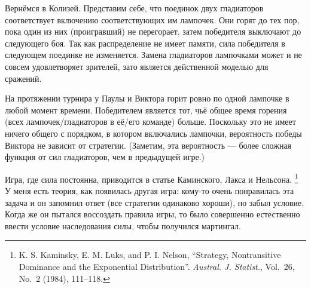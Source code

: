 Вернёмся в Колизей.
Представим себе, что поединок двух гладиаторов соответствует включению соответствующих им лампочек.
Они горят до тех пор, пока один из них (проигравший) не перегорает, затем победителя выключают до следующего боя.
Так как распределение не имеет памяти, сила победителя в следующем поединке не изменяется.
Замена гладиаторов лампочками может и не совсем удовлетворяет зрителей, зато является действенной моделью для сражений.

На протяжении турнира у Паулы и Виктора горит ровно по одной лампочке в любой момент времени.
Победителем является тот, чьё общее время горения (всех лампочек/гладиаторов в её/его команде) больше.
Поскольку это не имеет ничего общего с порядком, в котором включались лампочки, вероятность победы Виктора не зависит от стратегии.
(Заметим, эта вероятность --- более сложная функция от сил гладиаторов, чем в предыдущей игре.)
\heart

Игра, где сила постоянна, приводится в статье Каминского, Лакса и Нельсона.%
\footnote{K. S. Kaminsky, E. M. Luks, and P. I. Nelson, ``Strategy, Nontransitive Dominance and the Exponential Distribution''. \emph{Austral. J. Statist.}, Vol.~26, No.~2 (1984), 111--118.}
У меня есть теория, как появилась другая игра: кому-то очень понравилась эта задача и он запомнил ответ (все стратегии одинаково хороши), но забыл условие.
Когда же он пытался воссоздать правила игры, то было совершенно естественно ввести условие наследования силы, чтобы получился мартингал.
